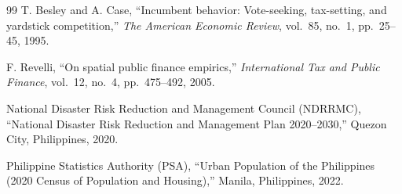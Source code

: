 \documentclass[conference]{IEEEtran}
\begin{document}
\begin{thebibliography}{99}
T. Besley and A. Case, ``Incumbent behavior: Vote-seeking, tax-setting, and yardstick competition,'' \textit{The American Economic Review}, vol.~85, no.~1, pp.~25--45, 1995.

F. Revelli, ``On spatial public finance empirics,'' \textit{International Tax and Public Finance}, vol.~12, no.~4, pp.~475--492, 2005.

National Disaster Risk Reduction and Management Council (NDRRMC), ``National Disaster Risk Reduction and Management Plan 2020--2030,'' Quezon City, Philippines, 2020.

Philippine Statistics Authority (PSA), ``Urban Population of the Philippines (2020 Census of Population and Housing),'' Manila, Philippines, 2022.

\end{thebibliography}
\end{document}
